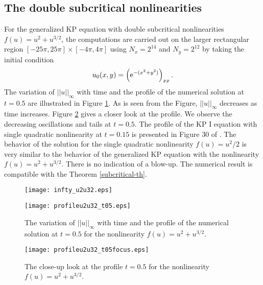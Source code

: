 \documentclass[10pt]{article}
\numberwithin{equation}{section}
\newcommand{\ee}{{\rm e}}
\begin{document}
	\subsection{The   double subcritical nonlinearities }
	For the generalized KP equation  with  double subcritical nonlinearities $f(u)=u^2+u^{3/2}$, the computations are carried out on the larger  rectangular region 
	$[-25\pi, 25\pi]\times [-4\pi, 4\pi]$ using ${N_x}=2^{14}$ and ${N_y}=2^{12}$ by taking the initial condition 
	\begin{equation}
		u_0(x,y)=  \left(\ee^ {-({x^2}+{y^2})}\right)_{xx} . \label{initial-u2u32}
	\end{equation}
	The variation of  $||u||_\infty$ with time and the profile of the numerical solution at  $t=0.5$  are illustrated in Figure \ref{u2u32}. As is seen from the 
	Figure,    $||u||_\infty$ decreases as time increases.   
	Figure \ref{u2u32focus} gives a closer look at the profile. We observe the decreasing oscillations and tails at $t=0.5$. The profile of the KP I equation with
	single quadratic nonlinearity at $t=0.15$ is presented in Figure $30$ of \cite{klein-saut}. The behavior of the solution for the single quadratic
	nonlinearity  $f(u)=u^2/2$  is very similar to the behavior of the generalized KP equation with the nonlinearity $f(u)=u^2+u^{3/2}$.
	There is no indication of a blow-up.  The numerical result is compatible with the Theorem \ref{subcritical-th}.
	
	\begin{figure}
		\begin{minipage}[t]{0.45\linewidth}
			\centering
			\texttt{[image: infty\_u2u32.eps]}
		\end{minipage}%
		\hspace{40pt}
		\begin{minipage}[t]{0.45\linewidth}
			\centering
			\texttt{[image: profileu2u32\_t05.eps]}
		\end{minipage}
		\caption{  The variation of  $||u||_\infty$ with time  and  the profile of the numerical solution at  $t=0.5$ for the nonlinearity $f(u)=u^2+u^{3/2}$. }\label{u2u32}
	\end{figure}
	\begin{figure}
		\centering
		\texttt{[image: profileu2u32\_t05focus.eps]}
		\caption{  The close-up look at the profile   $t=0.5$ for the nonlinearity $f(u)=u^2+u^{3/2}$. }\label{u2u32focus}
	\end{figure}
	
\end{document}
